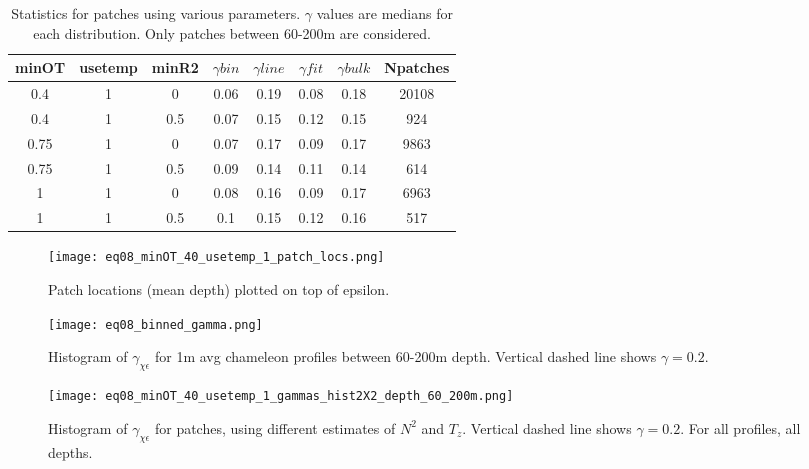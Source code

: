\documentclass[11pt]{article}
\begin{document}
\begin{table}[htdp]
\caption{Statistics for patches using various parameters. $\gamma$ values are medians for each distribution. Only patches between 60-200m are considered.}
\begin{center}
\begin{tabular}{|c|c|c|c|c|c|c|c|}
\hline
minOT & usetemp & minR2 & $\gamma bin$ & $\gamma line$ & $\gamma fit$ & $\gamma bulk$ & Npatches \\
\hline
0.4 & 1 & 0 & 0.06 & 0.19 & 0.08 & 0.18 & 20108 \\
\hline
0.4 & 1 & 0.5 & 0.07 & 0.15 & 0.12 & 0.15 & 924 \\
\hline
0.75 & 1 & 0 & 0.07 & 0.17 & 0.09 & 0.17 & 9863 \\
\hline
0.75 & 1 & 0.5 & 0.09 & 0.14 & 0.11 & 0.14 & 614 \\
\hline
1 & 1 & 0 & 0.08 & 0.16 & 0.09 & 0.17 & 6963 \\
\hline
1 & 1 & 0.5 & 0.1 & 0.15 & 0.12 & 0.16 & 517 \\
\hline
\hline
\end{tabular}
\end{center}
\label{tab}
\end{table}%


\begin{figure}[htbp]
\texttt{[image: eq08\_minOT\_40\_usetemp\_1\_patch\_locs.png]}
\caption{Patch locations (mean depth) plotted on top of epsilon.}
\label{}
\end{figure}


\begin{figure}[htbp]
\texttt{[image: eq08\_binned\_gamma.png]}
\caption{Histogram of $\gamma_{\chi\epsilon}$ for 1m avg chameleon profiles between 60-200m depth. Vertical dashed line shows $\gamma=0.2$.}
\label{avggam}
\end{figure}

\begin{figure}[htbp]
\texttt{[image: eq08\_minOT\_40\_usetemp\_1\_gammas\_hist2X2\_depth\_60\_200m.png]}
\caption{Histogram of $\gamma_{\chi\epsilon}$ for patches, using different estimates of $N^2$ and $T_z$. Vertical dashed line shows $\gamma=0.2$. For all profiles, all depths.}
\label{patchgam}
\end{figure}

\end{document}
